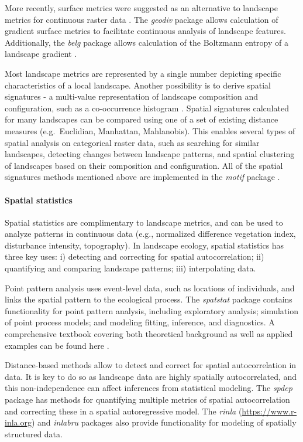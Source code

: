 \documentclass[smallextended]{svjour3}       %
\begin{document}
More recently, surface metrics were suggested as an alternative to landscape metrics for continuous raster data \cite{McGarigal2009}.
The \emph{geodiv} package \cite{Smith2020} allows calculation of gradient surface metrics to facilitate continuous analysis of landscape features.
Additionally, the \emph{belg} package allows calculation of the Boltzmann entropy of a landscape gradient \cite{Nowosad2020}.

Most landscape metrics are represented by a single number depicting specific characteristics of a local landscape.
Another possibility is to derive spatial signatures - a multi-value representation of landscape composition and configuration, such as a co-occurrence histogram \cite{Nowosad2021}.
Spatial signatures calculated for many landscapes can be compared using one of a set of existing distance measures (e.g.~Euclidian, Manhattan, Mahlanobis).
This enables several types of spatial analysis on categorical raster data, such as searching for similar landscapes, detecting changes between landscape patterns, and spatial clustering of landscapes based on their composition and configuration.
All of the spatial signatures methods mentioned above are implemented in the \emph{motif} package \cite{Nowosad2021}.

\hypertarget{spatial-statistics}{%
\paragraph{Spatial statistics}\label{spatial-statistics}}

Spatial statistics are complimentary to landscape metrics, and can be used to analyze patterns in continuous data (e.g., normalized difference vegetation index, disturbance intensity, topography).
In landscape ecology, spatial statistics has three key uses: i) detecting and correcting for spatial autocorrelation; ii) quantifying and comparing landscape patterns; iii) interpolating data.

Point pattern analysis uses event-level data, such as locations of individuals, and links the spatial pattern to the ecological process.
The \emph{spatstat} package \cite{Baddeley2005} contains functionality for point pattern analysis, including exploratory analysis; simulation of point process models; and modeling fitting, inference, and diagnostics.
A comprehensive textbook covering both theoretical background as well as applied examples can be found here \cite{Baddeley2015}.

Distance-based methods allow to detect and correct for spatial autocorrelation in data.
It is key to do so as landscape data are highly spatially autocorrelated, and this non-independence can affect inferences from statistical modeling.
The \emph{spdep} package \cite{Bivand2013} has methods for quantifying multiple metrics of spatial autocorrelation and correcting these in a spatial autoregressive model.
The \emph{rinla} \cite{Rue2009} (\url{https://www.r-inla.org}) and \emph{inlabru} \cite{Bachl2019} packages also provide functionality for modeling of spatially structured data.
\end{document}
